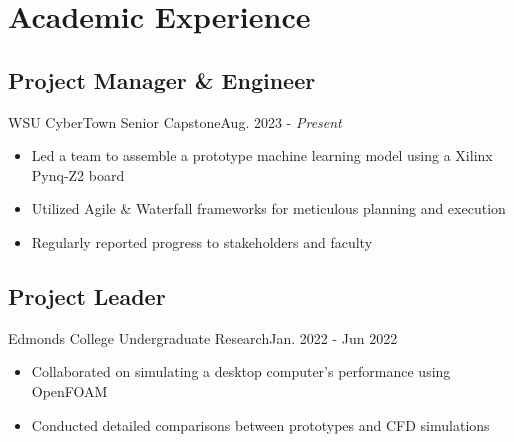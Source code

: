 \section{Academic Experience}
\subsection{Project Manager \& Engineer}{WSU CyberTown Senior Capstone}{Aug. 2023 - \textit{Present}}
\begin{itemize}
    \item Led a team to assemble a prototype machine learning model using a Xilinx Pynq-Z2 board
    \item Utilized Agile \& Waterfall frameworks for meticulous planning and execution
    \item Regularly reported progress to stakeholders and faculty
\end{itemize}

\subsection{Project Leader}{Edmonds College Undergraduate Research}{Jan. 2022 - Jun 2022}
\begin{itemize}
    \item Collaborated on simulating a desktop computer's performance using OpenFOAM
    \item Conducted detailed comparisons between prototypes and CFD simulations
\end{itemize}
